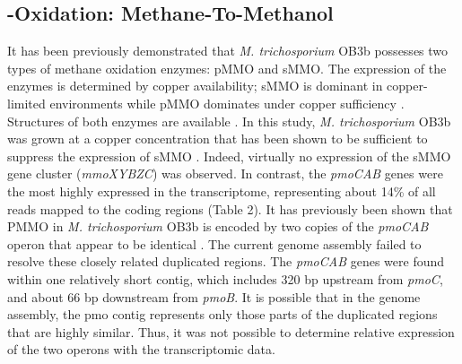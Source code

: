 \subsection{-Oxidation: Methane-To-Methanol}
It has been previously demonstrated that \textit{M. trichosporium} OB3b possesses two types of methane oxidation enzymes: pMMO and sMMO.
The expression of the enzymes is determined by copper availability; sMMO is dominant in copper-limited environments while pMMO dominates under copper sufficiency \cite{hakemian2007, semrau2010}.
Structures of both enzymes are available \cite{elango1997, hakemian2008}.
In this study, \textit{M. trichosporium} OB3b was grown at a copper concentration that has been shown to be sufficient to suppress the expression of sMMO \cite{park1991, phelps1992, nielsen1997, lloyd1999, murrell2000}.
Indeed, virtually no expression of the sMMO gene cluster (\textit{mmoXYBZC}) was observed.
In contrast, the \textit{pmoCAB} genes were the most highly expressed in the transcriptome, representing about 14\% of all reads mapped to the coding regions (Table 2).
It has previously been shown that PMMO in \textit{M. trichosporium} OB3b is encoded by two copies of the \textit{pmoCAB} operon that appear to be identical \cite{gilbert2000}.
The current genome assembly failed to resolve these closely related duplicated regions.
The \textit{pmoCAB} genes were found within one relatively short contig, which includes 320 bp upstream from \textit{pmoC}, and about 66 bp downstream from \textit{pmoB}.
It is possible that in the genome assembly, the pmo contig represents only those parts of the duplicated regions that are highly similar.
Thus, it was not possible to determine relative expression of the two operons with the transcriptomic data.

